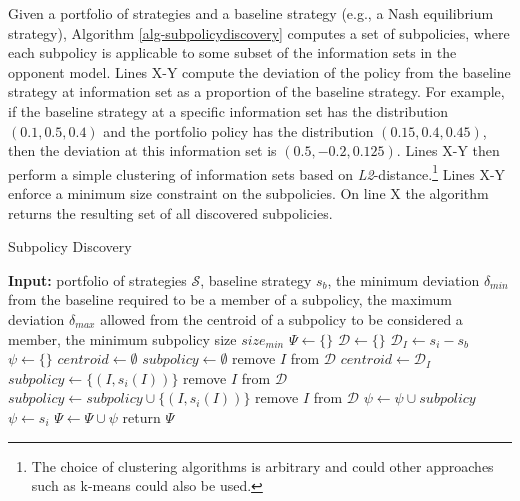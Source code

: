 \documentclass{aamas2013}
\begin{document}
    Given a portfolio of strategies and a baseline strategy (e.g., a Nash equilibrium strategy), Algorithm \ref{alg-subpolicydiscovery} computes a set of subpolicies, where each subpolicy is applicable to some subset of the information sets in the opponent model. Lines X-Y compute the deviation of the policy from the baseline strategy at information set as a proportion of the baseline strategy. For example, if the baseline strategy at a specific information set has the distribution $(0.1,0.5,0.4)$ and the portfolio policy has the distribution $(0.15, 0.4, 0.45)$, then the deviation at this information set is $(0.5, -0.2, 0.125)$. Lines X-Y then perform a simple clustering of information sets based on \textit{L2}-distance.\footnote{The choice of clustering algorithms is arbitrary and could other approaches such as k-means could also be used.} Lines X-Y enforce a minimum size constraint on the subpolicies. On line X the algorithm returns the resulting set of all discovered subpolicies.

    \begin{algorithm}
    \caption{Subpolicy Discovery}
    \label{alg-subpolicydiscovery}
    \begin{algorithmic}[1]
    \STATE \textbf{Input:} portfolio of strategies $\mathcal{S}$, baseline strategy $s_b$, the minimum deviation $\delta_{min}$ from the baseline required to be a member of a subpolicy, the maximum deviation $\delta_{max}$ allowed from the centroid of a subpolicy to be considered a member, the minimum subpolicy size $size_{min}$
    \STATE $\Psi \leftarrow \{\}$
        \STATE $\mathcal{D} \leftarrow \{\}$
            \STATE $\mathcal{D}_{I} \leftarrow s_i - s_b$
        \ENDFOR
        \STATE $\psi \leftarrow \{\}$
            \STATE $centroid \leftarrow \emptyset$
            \STATE $subpolicy \leftarrow \emptyset$
                    \STATE remove $I$ from $\mathcal{D}$
                    \STATE $centroid \leftarrow \mathcal{D}_I$
                    \STATE $subpolicy \leftarrow \{(I,s_i(I))\}$
                    \STATE remove $I$ from $\mathcal{D}$
                    \STATE $subpolicy \leftarrow subpolicy \cup \{(I,s_i(I))\}$
                    \STATE remove $I$ from $\mathcal{D}$
                \ENDIF
            \ENDFOR
                \STATE $\psi \leftarrow \psi \cup subpolicy$
            \ENDIF
        \ENDWHILE
        \IF{$\psi = \emptyset$}
            \STATE $\psi \leftarrow s_i$
        \ENDIF
        \STATE $\Psi \leftarrow \Psi \cup \psi$
    \ENDFOR
    \STATE return $\Psi$
    \end{algorithmic}
    \end{algorithm}
\end{document}
